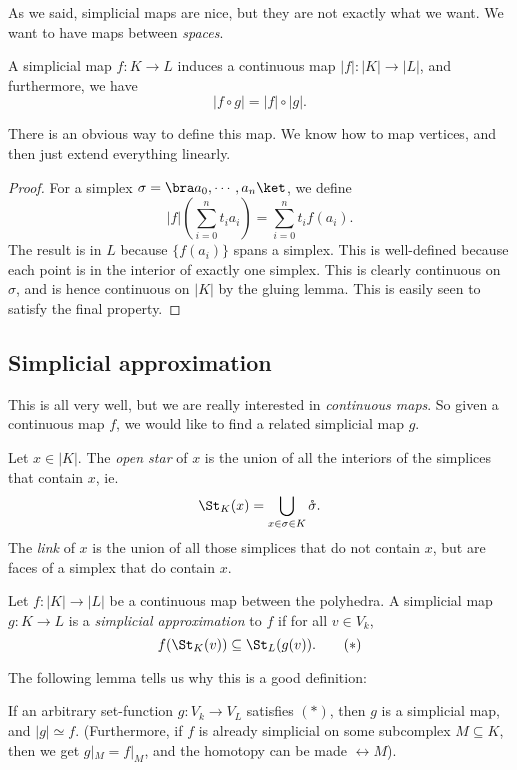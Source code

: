\documentclass[a4paper]{article}
\begin{document}
As we said, simplicial maps are nice, but they are not exactly what we want. We want to have maps between \emph{spaces}.
\begin{lemma}
  A simplicial map $f: K \to L$ induces a continuous map $|f|: |K|\to |L|$, and furthermore, we have
  \[
    |f\circ g| = |f|\circ |g|.
  \]
\end{lemma}
There is an obvious way to define this map. We know how to map vertices, and then just extend everything linearly.
\begin{proof}
  For a simplex $\sigma = \bra a_0,\cdots, a_n\ket$, we define
  \[
    |f|\left(\sum_{i = 0}^n t_i a_i\right) = \sum_{i = 0}^n t_i f(a_i).
  \]
  The result is in $L$ because $\{f(a_i)\}$ spans a simplex. This is well-defined because each point is in the interior of exactly one simplex. This is clearly continuous on $\sigma$, and is hence continuous on $|K|$ by the gluing lemma. This is easily seen to satisfy the final property.
\end{proof}

\subsection{Simplicial approximation}
This is all very well, but we are really interested in \emph{continuous maps}. So given a continuous map $f$, we would like to find a related simplicial map $g$.

\begin{defi}
  Let $x \in |K|$. The \emph{open star} of $x$ is the union of all the interiors of the simplices that contain $x$, ie.
  \[
    \St_K(x) = \bigcup_{x \in \sigma \in K} \mathring{\sigma}.
  \]
  The \emph{link} of $x$ is the union of all those simplices that do not contain $x$, but are faces of a simplex that do contain $x$.
\end{defi}

\begin{defi}
  Let $f: |K| \to |L|$ be a continuous map between the polyhedra. A simplicial map $g: K \to L$ is a \emph{simplicial approximation} to $f$ if for all $v \in V_k$,
  \[
    f(\St_K(v)) \subseteq \St_L(g(v)).\tag{$*$}
  \]
\end{defi}

The following lemma tells us why this is a good definition:
\begin{lemma}
  If an arbitrary set-function $g: V_k \to V_L$ satisfies $(*)$, then $g$ is a simplicial map, and $|g| \simeq f$. (Furthermore, if $f$ is already simplicial on some subcomplex $M\subseteq K$, then we get $g|_M = f|_M$, and the homotopy can be made $\rel M$).
\end{lemma}
\end{document}
